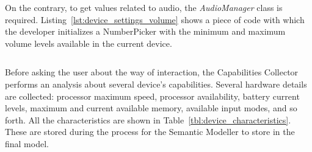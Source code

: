 \inputminted[linenos=true, fontsize=\footnotesize, frame=lines]{java}{4_system_architecture/device_settings_brightness.java}


On the contrary, to get values related to audio, the \textit{AudioManager} class
is required. Listing~\ref{lst:device_settings_volume} shows a piece of code with
which the developer initializes a NumberPicker with the minimum and maximum
volume levels available in the current device.

\inputminted[linenos=true, fontsize=\footnotesize, frame=lines]{java}{4_system_architecture/device_settings_volume.java}


Before asking the user about the way of interaction, the Capabilities Collector
performs an analysis about several device's capabilities. Several hardware
details are collected: processor maximum speed, processor availability, battery
current levels, maximum and current available memory, available input modes, 
and so forth. All the characteristics are shown in Table~\ref{tbl:device_characteristics}. 
These are stored during the process for the Semantic Modeller to store in the 
final model.

